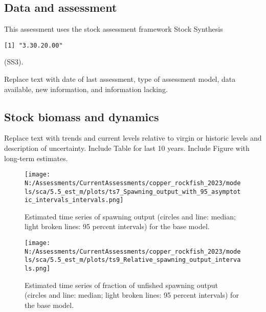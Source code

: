 \documentclass[11pt,
  english,
  letterpaper,
]{article}
\begin{document}
\hypertarget{data-and-assessment}{%
\subsection*{Data and assessment}\label{data-and-assessment}}

This assessment uses the stock assessment framework Stock Synthesis

\begin{verbatim}
[1] "3.30.20.00"
\end{verbatim}

(SS3).

Replace text with date of last assessment, type of assessment model, data available, new information, and information lacking.

\hypertarget{stock-biomass-and-dynamics}{%
\subsection*{Stock biomass and dynamics}\label{stock-biomass-and-dynamics}}

Replace text with trends and current levels relative to virgin or historic levels and description of uncertainty. Include Table for last 10 years. Include Figure with long-term estimates.



\begin{figure}
\centering
\texttt{[image: N:/Assessments/CurrentAssessments/copper\_rockfish\_2023/models/sca/5.5\_est\_m/plots/ts7\_Spawning\_output\_with\_95\_asymptotic\_intervals\_intervals.png]}
\caption{Estimated time series of spawning output (circles and line: median; light broken lines: 95 percent intervals) for the base model.\label{fig:es-sb}}
\end{figure}

\begin{figure}
\centering
\texttt{[image: N:/Assessments/CurrentAssessments/copper\_rockfish\_2023/models/sca/5.5\_est\_m/plots/ts9\_Relative\_spawning\_output\_intervals.png]}
\caption{Estimated time series of fraction of unfished spawning output (circles and line: median; light broken lines: 95 percent intervals) for the base model.\label{fig:es-depl}}
\end{figure}

\clearpage
\end{document}
